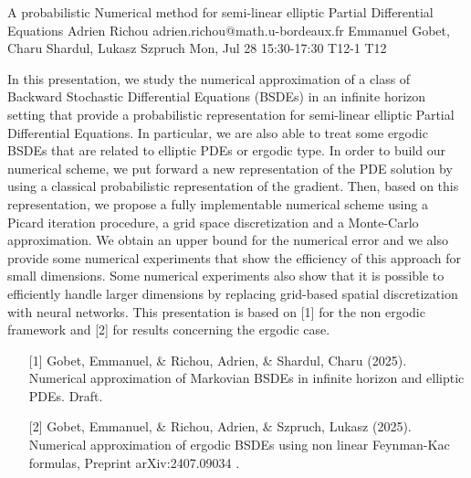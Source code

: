 \begin{talk}
  {A probabilistic Numerical method for semi-linear elliptic Partial Differential Equations}%
  {Adrien Richou}%
  {adrien.richou@math.u-bordeaux.fr}%
  {Emmanuel Gobet, Charu Shardul, Lukasz Szpruch}%
  {}%
  {}%
  {Mon, Jul 28 15:30-17:30}%
  {T12-1}%
  {T12}%
  
				
			
In this presentation, we study the numerical approximation of a class of Backward Stochastic Differential Equations (BSDEs) in an infinite horizon setting that provide a probabilistic representation for semi-linear elliptic Partial Differential Equations. In particular, we are also able to treat some ergodic BSDEs that are related to elliptic PDEs or ergodic type. In order to build our numerical scheme, we put forward a new representation of the PDE solution by using a classical probabilistic representation of the gradient. Then, based on this representation, we propose a fully implementable numerical scheme using a Picard iteration procedure, a grid space discretization and a Monte-Carlo approximation. We obtain an upper bound for the numerical error and we also provide some numerical experiments that show the
efficiency of this approach for small dimensions. Some numerical experiments also show that it is possible to efficiently handle larger dimensions by replacing grid-based spatial discretization with neural networks. This presentation is based on [1] for the non ergodic framework and [2] for results concerning the ergodic case.

\medskip

\begin{enumerate}
	\item[{[1]}] Gobet, Emmanuel, \& Richou, Adrien, \& Shardul, Charu (2025). Numerical approximation of Markovian BSDEs in infinite
  horizon and elliptic PDEs. Draft.
	\item[{[2]}] Gobet, Emmanuel, \& Richou, Adrien, \& Szpruch, Lukasz (2025).  Numerical approximation of ergodic BSDEs using non
  linear Feynman-Kac formulas, Preprint arXiv:2407.09034 .
\end{enumerate}

\end{talk}

